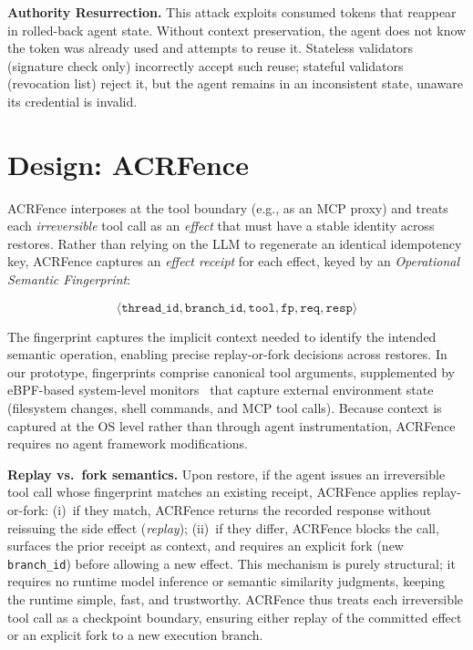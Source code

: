 \documentclass[sigplan,nonacm]{acmart}
\newcommand{\sys}{ACRFence}
\begin{document}
\textbf{Authority Resurrection.}\label{sec:v2} This attack exploits consumed tokens that reappear in rolled-back agent state. Without context preservation, the agent does not know the token was already used and attempts to reuse it. Stateless validators (signature check only) incorrectly accept such reuse; stateful validators (revocation list) reject it, but the agent remains in an inconsistent state, unaware its credential is invalid.

\section{Design: \sys}
\label{sec:design}

\sys{} interposes at the tool boundary (e.g., as an MCP proxy) and treats each \emph{irreversible} tool call as an \emph{effect} that must have a stable identity across restores. Rather than relying on the LLM to regenerate an identical idempotency key, \sys{} captures an \emph{effect receipt} for each effect, keyed by an \emph{Operational Semantic Fingerprint}:
\begin{small}
\[\langle \texttt{thread\_id}, \texttt{branch\_id}, \texttt{tool}, \texttt{fp}, \texttt{req}, \texttt{resp} \rangle\]
\end{small}
The fingerprint captures the implicit context needed to identify the intended semantic operation, enabling precise replay-or-fork decisions across restores. In our prototype, fingerprints comprise canonical tool arguments, supplemented by eBPF-based system-level monitors~\cite{zheng2025agentsight} that capture external environment state (filesystem changes, shell commands, and MCP tool calls). Because context is captured at the OS level rather than through agent instrumentation, \sys{} requires no agent framework modifications.

\textbf{Replay vs.\ fork semantics.} Upon restore, if the agent issues an irreversible tool call whose fingerprint matches an existing receipt, \sys{} applies replay-or-fork: (i)~if they match, \sys{} returns the recorded response without reissuing the side effect (\emph{replay}); (ii)~if they differ, \sys{} blocks the call, surfaces the prior receipt as context, and requires an explicit fork (new \texttt{branch\_id}) before allowing a new effect. This mechanism is purely structural; it requires no runtime model inference or semantic similarity judgments, keeping the runtime simple, fast, and trustworthy. \sys{} thus treats each irreversible tool call as a checkpoint boundary, ensuring either replay of the committed effect or an explicit fork to a new execution branch.
\end{document}
